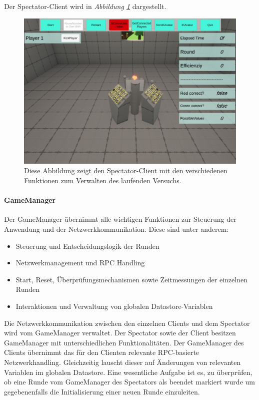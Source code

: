 \documentclass[a4paper,11pt]{article}%
\renewcommand{\\}{\vspace*{0.5\baselineskip} \newline}
\begin{document}
Der Spectator-Client wird in \textit{Abbildung \ref{SpectatorView}} dargestellt.

\begin{figure}[H]
		\begin{footnotesize}
		\centering
			\includegraphics[scale=0.3]{Abbildungen/Versuchsumgebung/SpectatorView.JPG}
			\caption[Der Spectatorview]{Diese Abbildung zeigt den Spectator-Client mit den verschiedenen Funktionen zum Verwalten des laufenden Versuchs.}
			\label{SpectatorView}
		\end{footnotesize}
	\end{figure}
	
\paragraph{GameManager}
Der GameManager übernimmt alle wichtigen Funktionen zur Steuerung der Anwendung und der Netzwerkkommunikation.
Diese sind unter anderem:
\begin{itemize}[itemsep=0cm]
\item Steuerung und Entscheidungslogik der Runden
\item Netzwerkmanagement und RPC Handling
\item Start, Reset, Überprüfungsmechanismen sowie Zeitmessungen der einzelnen Runden
\item Interaktionen und Verwaltung von globalen Datastore-Variablen
\end{itemize}

Die Netzwerkkommunikation zwischen den einzelnen Clients und dem Spectator wird vom GameManager verwaltet. Der Spectator sowie der Client besitzen GameManager mit unterschiedlichen Funktionalitäten. Der GameManager des Clients übernimmt das für den Clienten relevante RPC-basierte Netzwerkhandling. Gleichzeitig lauscht dieser auf Änderungen von relevanten Variablen im globalen Datastore. Eine wesentliche Aufgabe ist es, zu überprüfen, ob eine Runde vom GameManager des Spectators als beendet markiert wurde um gegebenenfalls die Initialisierung einer neuen Runde einzuleiten.
\end{document}
